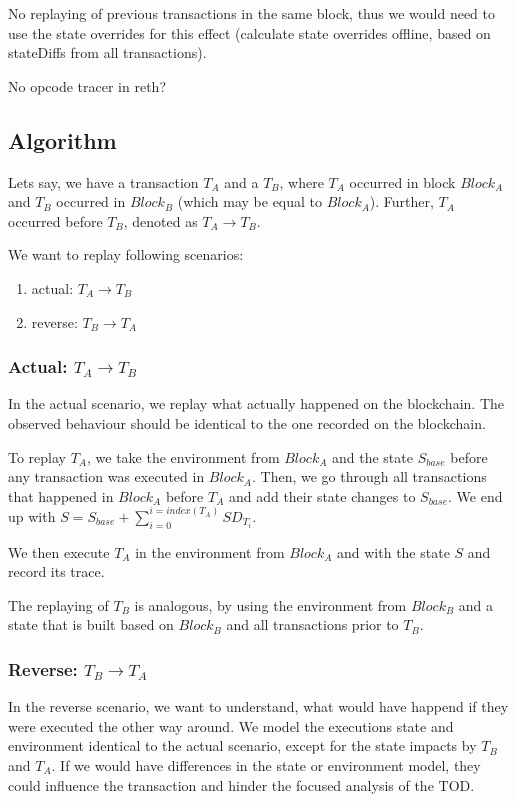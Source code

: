\documentclass[draft,final]{vutinfth} %
\begin{document}
No replaying of previous transactions in the same block, thus we would need to use the state overrides for this effect (calculate state overrides offline, based on stateDiffs from all transactions).

No opcode tracer in reth?

\subsection{Algorithm}

Lets say, we have a transaction $T_A$ and a $T_B$, where $T_A$ occurred in block $Block_A$ and $T_B$ occurred in $Block_B$ (which may be equal to $Block_A$). Further, $T_A$ occurred before $T_B$, denoted as $T_A \rightarrow T_B$.

We want to replay following scenarios:

\begin{enumerate}
    \item actual: $T_A \rightarrow T_B$
    \item reverse: $T_B \rightarrow T_A$
\end{enumerate}

\subsubsection{Actual: $T_A \rightarrow T_B$}
In the actual scenario, we replay what actually happened on the blockchain. The observed behaviour should be identical to the one recorded on the blockchain.

To replay $T_A$, we take the environment from $Block_A$ and the state $S_{base}$ before any transaction was executed in $Block_A$. Then, we go through all transactions that happened in $Block_A$ before $T_A$ and add their state changes to $S_{base}$. We end up with $S = S_{base} + \sum_{i=0}^{i=index(T_A)}SD_{T_i}$.

We then execute $T_A$ in the environment from $Block_A$ and with the state $S$ and record its trace.

The replaying of $T_B$ is analogous, by using the environment from $Block_B$ and a state that is built based on $Block_B$ and all transactions prior to $T_B$.

\subsubsection{Reverse: $T_B \rightarrow T_A$}

In the reverse scenario, we want to understand, what would have happend if they were executed the other way around. We model the executions state and environment identical to the actual scenario, except for the state impacts by $T_B$ and $T_A$. If we would have differences in the state or environment model, they could influence the transaction and hinder the focused analysis of the TOD.
\end{document}
